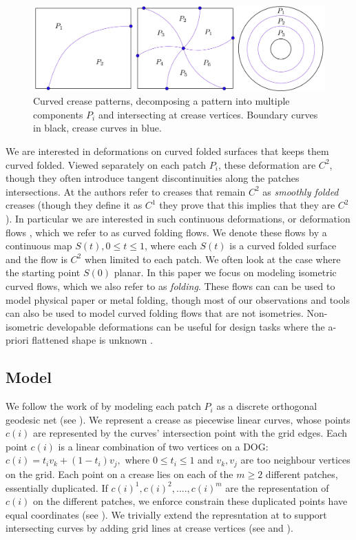 \begin{figure} [h]
	\centering
	\includegraphics[width=\linewidth]{figures/crease_patterns}
	\caption{Curved crease patterns, decomposing a pattern into multiple components $P_i$ and intersecting at crease vertices. Boundary curves in black, crease curves in blue.}
	\label{fig:crease_pattern}
\end{figure}
We are interested in deformations on curved folded surfaces that keeps them curved folded. Viewed separately on each patch $P_i$, these deformation are $C^2$, though they often introduce tangent discontinuities along the patches intersections. At \cite{demaine_lens} the authors refer to creases that remain $C^2$ as \textit{smoothly folded} creases (though they define it as $C^1$ they prove that this implies that they are $C^2$). In particular we are interested in such continuous deformations, or deformation flows \cite{rabi2018shape}, which we refer to as curved folding flows. We denote these flows by a continuous map $S(t), 0 \leq t \leq 1$, where each $S(t)$ is a curved folded surface and the flow is $C^2$ when limited to each patch. We often look at the case where the starting point $S(0)$ planar. In this paper we focus on modeling isometric curved flows, which we also refer to as \emph{folding}. These flows can can be used to model physical paper or metal folding, though most of our observations and tools can also be used to model curved folding flows that are not isometries. Non-isometric developable deformations can be useful for design tasks where the a-priori flattened shape is unknown \cite{rabi18,rabi2018shape} .

\subsection{Model} \label{sec:model}
We follow the work of \cite{rabi2018shape} by modeling each patch $P_i$ as a discrete orthogonal geodesic net (see ). We represent a crease as piecewise linear curves, whose points $c(i)$ are represented by the curves' intersection point with the grid edges. Each point $c(i)$ is a linear combination of two vertices on a DOG: $c(i) = t_i v_k + (1-t_i)v_j,$ where $0 \leq t_i \leq 1$ and $v_k,v_j$ are too neighbour vertices on the grid.  Each point on a crease lies on each of the $m \geq 2$ different patches, essentially duplicated. If $c(i)^1,c(i)^2,....,c(i)^m$ are the representation of $c(i)$ on the different patches, we enforce constrain these duplicated points have equal coordinates (see ).
We trivially extend the represntation at \cite{rabi2018shape} to support intersecting curves by adding grid lines at crease vertices (see  and ).

